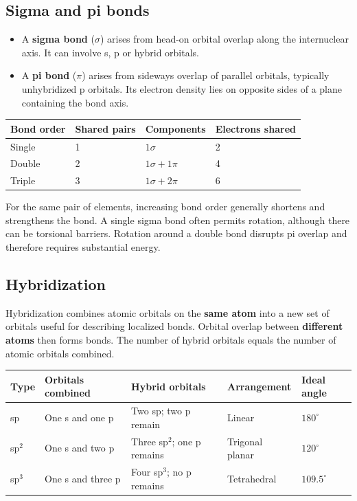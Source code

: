 \documentclass[a4paper,10pt]{article}
\begin{document}
\subsection{Sigma and pi bonds}
\begin{itemize}
  \item A \textbf{sigma bond} ($\sigma$) arises from head-on orbital overlap along
  the internuclear axis. It can involve s, p or hybrid orbitals.
  \item A \textbf{pi bond} ($\pi$) arises from sideways overlap of parallel
  orbitals, typically unhybridized p orbitals. Its electron density lies on
  opposite sides of a plane containing the bond axis.
\end{itemize}
\begin{center}
\begin{tabular}{@{}llll@{}}
\toprule
Bond order & Shared pairs & Components & Electrons shared \\
\midrule
Single & 1 & $1\sigma$ & 2 \\
Double & 2 & $1\sigma+1\pi$ & 4 \\
Triple & 3 & $1\sigma+2\pi$ & 6 \\
\bottomrule
\end{tabular}
\end{center}
For the same pair of elements, increasing bond order generally shortens and
strengthens the bond. A single sigma bond often permits rotation, although
there can be torsional barriers. Rotation around a double bond disrupts pi
overlap and therefore requires substantial energy.

\subsection{Hybridization}
Hybridization combines atomic orbitals on the \textbf{same atom} into a new set
of orbitals useful for describing localized bonds. Orbital overlap between
\textbf{different atoms} then forms bonds. The number of hybrid orbitals equals
the number of atomic orbitals combined.

\begin{tabularx}{\linewidth}{@{}lLLLl@{}}
\toprule
Type & Orbitals combined & Hybrid orbitals & Arrangement & Ideal angle \\
\midrule
sp & One s and one p & Two sp; two p remain & Linear & $180^\circ$ \\
sp$^2$ & One s and two p & Three sp$^2$; one p remains & Trigonal planar & $120^\circ$ \\
sp$^3$ & One s and three p & Four sp$^3$; no p remains & Tetrahedral & $109.5^\circ$ \\
\bottomrule
\end{tabularx}
\end{document}
